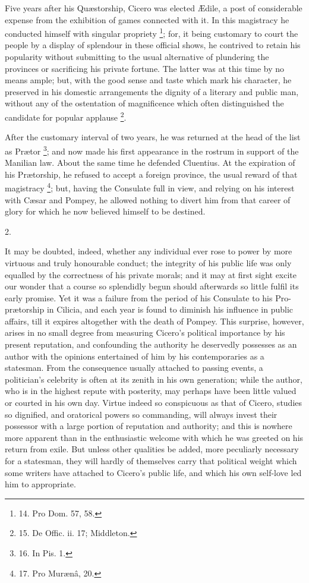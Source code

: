 Five years after his Quæstorship,
Cicero was elected Ædile, a post of considerable expense from the
exhibition of games connected with it. In this magistracy he conducted
himself with singular propriety \footnote{14. Pro Dom. 57, 58.}; for, it being customary to court the people by a display of
splendour in these official shows, he contrived to retain his
popularity without submitting to the usual alternative of plundering
the provinces or sacrificing his private fortune. The latter was at
this time by no means ample; but, with the good sense and taste which
mark his character, he preserved in his domestic arrangements the
dignity of a literary and public man, without any of the ostentation
of magnificence which often distinguished the candidate for popular
applause \footnote{15. De Offic. ii. 17;
Middleton.}.

After the customary interval
of two years, he was returned at the head of the list as Prætor
\footnote{16. In
Pis. 1.}; and now made his
first appearance in the rostrum in support of the Manilian law. About
the same time he defended Cluentius. At the expiration of his Prætorship,
he refused to accept a foreign province, the usual reward of that
magistracy \footnote{17. Pro
Murænâ, 20.}; but,
having the Consulate full in view, and relying on his interest with Cæsar
and Pompey, he allowed nothing to divert him from that career of glory
for which he now believed himself to be destined.

2.

It may be doubted, indeed,
whether any individual ever rose to power by more virtuous and truly
honourable conduct; the integrity of his public life was only equalled
by the correctness of his private morals; and it may at first sight
excite our wonder that a course so splendidly begun should afterwards
so little fulfil its early promise. Yet it was a failure from the
period of his Consulate to his Pro-prætorship in Cilicia, and each
year is found to diminish his influence in public affairs, till it
expires altogether with the death of Pompey. This surprise, however,
arises in no small degree from measuring Cicero's political importance
by his present reputation, and confounding the authority he deservedly
possesses as an author with the opinions entertained of him by his
contemporaries as a statesman. From the consequence usually attached
to passing events, a politician's celebrity is often at its zenith in
his own generation; while the author, who is in the highest repute
with posterity, may perhaps have been little valued or courted in his
own day. Virtue indeed so conspicuous as that of Cicero, studies so
dignified, and oratorical powers so commanding, will always
invest their possessor with a large portion of reputation and
authority; and this is nowhere more apparent than in the enthusiastic
welcome with which he was greeted on his return from exile. But unless
other qualities be added, more peculiarly necessary for a statesman,
they will hardly of themselves carry that political weight which some
writers have attached to Cicero's public life, and which his own
self-love led him to appropriate.

